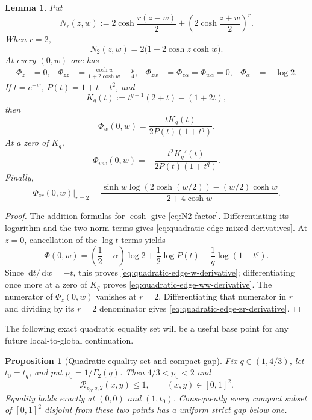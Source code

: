 \documentclass[11pt,reqno]{amsart}
\numberwithin{equation}{section}
\newtheorem{proposition}[proposition]{Proposition}
\newtheorem{lemma}[lemma]{Lemma}
\theoremstyle{definition}
\theoremstyle{remark}
\newcommand{\dd}{\,\mathrm d}
\begin{document}
\begin{lemma}
\label{lem:quadratic-edge-derivatives}
Put
\[
  N_r(z,w):=2\cosh\frac{r(z-w)}2
  +\left(2\cosh\frac{z+w}{2}\right)^r.
\]
When $r=2$,
\begin{equation}\label{eq:N2-factor}
  N_2(z,w)=2\bigl(1+2\cosh z\cosh w\bigr).
\end{equation}
At every $(0,w)$ one has
\begin{align}\label{eq:quadratic-edge-mixed-derivatives}
  \Phi_z&=0,&
  \Phi_{zz}&=\frac{\cosh w}{1+2\cosh w}-\frac p4,&
  \Phi_{zw}&=\Phi_{z\alpha}=\Phi_{w\alpha}=0,&
  \Phi_\alpha&=-\log2.
\end{align}
If $t=e^{-w}$, $P(t)=1+t+t^2$, and
\[
  K_q(t):=t^{q-1}(2+t)-(1+2t),
\]
then
\begin{equation}\label{eq:quadratic-edge-w-derivative}
  \Phi_w(0,w)
  =\frac{tK_q(t)}{2P(t)(1+t^q)}.
\end{equation}
At a zero of $K_q$,
\begin{equation}\label{eq:quadratic-edge-ww-derivative}
  \Phi_{ww}(0,w)
  =-\frac{t^2K_q'(t)}{2P(t)(1+t^q)}.
\end{equation}
Finally,
\begin{equation}\label{eq:quadratic-edge-zr-derivative}
  \left.\Phi_{zr}(0,w)\right|_{r=2}
  =\frac{\sinh w\log(2\cosh(w/2))-(w/2)\cosh w}
  {2+4\cosh w}.
\end{equation}
\end{lemma}

\begin{proof}
The addition formulas for $\cosh$ give \eqref{eq:N2-factor}.  Differentiating
its logarithm and the two norm terms gives
\eqref{eq:quadratic-edge-mixed-derivatives}.  At $z=0$, cancellation of the
$\log t$ terms yields
\[
  \Phi(0,w)
  =\left(\frac12-\alpha\right)\log2
   +\frac12\log P(t)-\frac1q\log(1+t^q).
\]
Since $\dd t/\dd w=-t$, this proves
\eqref{eq:quadratic-edge-w-derivative}; differentiating once more at a zero of
$K_q$ proves \eqref{eq:quadratic-edge-ww-derivative}.  The numerator of
$\Phi_z(0,w)$ vanishes at $r=2$.  Differentiating that numerator in $r$ and
dividing by its $r=2$ denominator gives
\eqref{eq:quadratic-edge-zr-derivative}.
\end{proof}

The following exact quadratic equality set will be a useful base point for any
future local-to-global continuation.

\begin{proposition}[Quadratic equality set and compact gap]
\label{prop:quadratic-equality-gap}
Fix $q\in(1,4/3)$, let $t_0=t_q$, and put
$p_0=1/\Gamma_2(q)$.  Then $4/3<p_0<2$ and
\[
  \mathcal R_{p_0,q,2}(x,y)\le1,
  \qquad (x,y)\in[0,1]^2.
\]
Equality holds exactly at $(0,0)$ and $(1,t_0)$.  Consequently every compact
subset of $[0,1]^2$ disjoint from these two points has a uniform strict gap
below one.
\end{proposition}
\end{document}
